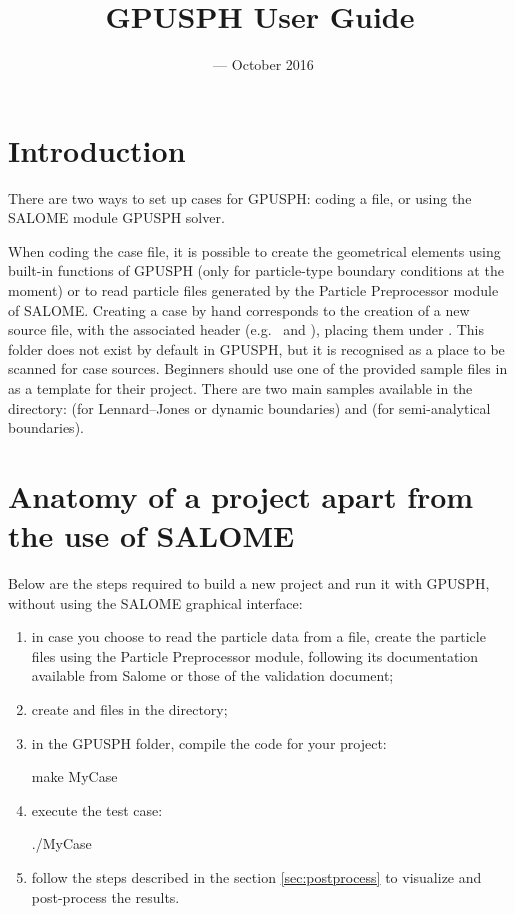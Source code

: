 \documentclass{../GPUSPHtemplate}
\title{GPUSPH User Guide}
\author{}
\date{\currentver\ --- October 2016}
\begin{document}
\maketitle
\tableofcontents
\newpage
\section{Introduction}

There are two ways to set up cases for GPUSPH: coding a  file,
or using the SALOME module GPUSPH solver.

When coding the case file, it is possible to create the geometrical elements
using built-in functions of GPUSPH
(only for particle-type boundary conditions at the moment) or to read particle
files generated by the Particle Preprocessor module of SALOME.
Creating a case by hand corresponds to the creation of a new \cu source file, with
the associated header (e.g.\  and ),
placing them under . This folder does not exist by default in GPUSPH,
but it is recognised as a place to be scanned for case sources.
Beginners should use one of the provided sample files in  
as a template for their project.
There are two main samples available in the  directory: 
 (for Lennard--Jones or dynamic boundaries) 
and  (for semi-analytical boundaries).

\section{Anatomy of a project apart from the use of SALOME}

Below are the steps required to build a new project and run it with GPUSPH, without
using the SALOME graphical interface:
\begin{enumerate}
\item in case you choose to read the particle data from a file, create the particle
  files using the Particle Preprocessor module, following its documentation available from Salome
  or those of the validation document;
\item create  and  files in 
the  directory;
\item in the GPUSPH folder, compile the code for your project:
\begin{shellcode}
make MyCase
\end{shellcode}
\item execute the test case:
\begin{shellcode}
./MyCase
\end{shellcode}
\item follow the steps described in the section \ref{sec:postprocess} 
to visualize and post-process the results.
\end{enumerate}
\end{document}
